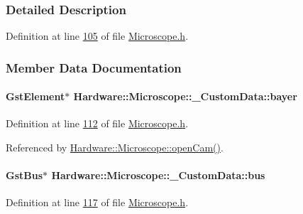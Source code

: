 \subsubsection{Detailed Description}


Definition at line \hyperlink{_microscope_8h_source_l00105}{105} of file \hyperlink{_microscope_8h_source}{Microscope.\+h}.



\subsubsection{Member Data Documentation}
\hypertarget{struct_hardware_1_1_microscope_1_1___custom_data_af7aa9d3b405cad2f564537954c3b70e7}{}
\paragraph[{bayer}]{\setlength{\rightskip}{0pt plus 5cm}Gst\+Element$\ast$ Hardware\+::\+Microscope\+::\+\_\+\+Custom\+Data\+::bayer}\label{struct_hardware_1_1_microscope_1_1___custom_data_af7aa9d3b405cad2f564537954c3b70e7}


Definition at line \hyperlink{_microscope_8h_source_l00112}{112} of file \hyperlink{_microscope_8h_source}{Microscope.\+h}.



Referenced by \hyperlink{_microscope_8cpp_source_l00167}{Hardware\+::\+Microscope\+::open\+Cam()}.

\hypertarget{struct_hardware_1_1_microscope_1_1___custom_data_a92300301898e4dbcedf3d74ca3db3825}{}
\paragraph[{bus}]{\setlength{\rightskip}{0pt plus 5cm}Gst\+Bus$\ast$ Hardware\+::\+Microscope\+::\+\_\+\+Custom\+Data\+::bus}\label{struct_hardware_1_1_microscope_1_1___custom_data_a92300301898e4dbcedf3d74ca3db3825}


Definition at line \hyperlink{_microscope_8h_source_l00117}{117} of file \hyperlink{_microscope_8h_source}{Microscope.\+h}.



